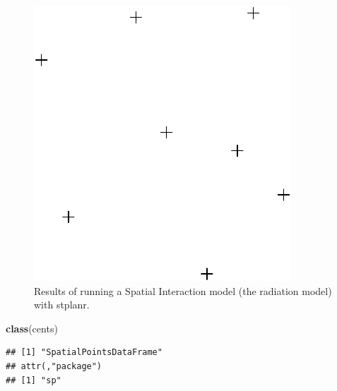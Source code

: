 \documentclass[11pt]{article}
\newenvironment{Shaded}{\begin{snugshade}}{\end{snugshade}}
\newcommand{\KeywordTok}[1]{\textcolor[rgb]{0.13,0.29,0.53}{\textbf{{#1}}}}
\newcommand{\DataTypeTok}[1]{\textcolor[rgb]{0.13,0.29,0.53}{{#1}}}
\newcommand{\DecValTok}[1]{\textcolor[rgb]{0.00,0.00,0.81}{{#1}}}
\newcommand{\StringTok}[1]{\textcolor[rgb]{0.31,0.60,0.02}{{#1}}}
\newcommand{\CommentTok}[1]{\textcolor[rgb]{0.56,0.35,0.01}{\textit{{#1}}}}
\newcommand{\NormalTok}[1]{{#1}}
\begin{document}
\begin{figure}
\includegraphics[width=\textwidth]{stplanr-paper_files/figure-latex/unnamed-chunk-8-1} \caption{Results of running a Spatial Interaction model (the radiation model) with stplanr.}\label{fig:unnamed-chunk-81}
\end{figure}

\begin{Shaded}
\begin{Highlighting}[]
\KeywordTok{class}\NormalTok{(cents)}
\end{Highlighting}
\end{Shaded}

\begin{verbatim}
## [1] "SpatialPointsDataFrame"
## attr(,"package")
## [1] "sp"
\end{verbatim}

\begin{Shaded}
\end{Shaded}
\end{document}

